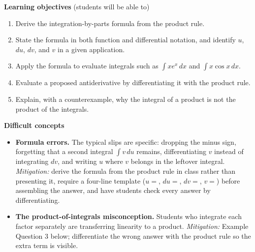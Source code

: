 \documentclass[11pt]{article}
\begin{document}
\textbf{Learning objectives} (students will be able to)
\begin{enumerate}
\item Derive the integration-by-parts formula from the product rule.
\item State the formula in both function and differential notation, and identify $u$, $du$, $dv$, and $v$ in a given application.
\item Apply the formula to evaluate integrals such as $\int xe^x\,dx$ and $\int x\cos x\,dx$.
\item Evaluate a proposed antiderivative by differentiating it with the product rule.
\item Explain, with a counterexample, why the integral of a product is not the product of the integrals.
\end{enumerate}

\textbf{Difficult concepts}
\begin{itemize}
\item \textbf{Formula errors.} The typical slips are specific: dropping the minus sign, forgetting that a second integral $\int v\,du$ remains, differentiating $v$ instead of integrating $dv$, and writing $u$ where $v$ belongs in the leftover integral. \emph{Mitigation:} derive the formula from the product rule in class rather than presenting it, require a four-line template ($u=$, $du=$, $dv=$, $v=$) before assembling the answer, and have students check every answer by differentiating.
\item \textbf{The product-of-integrals misconception.} Students who integrate each factor separately are transferring linearity to a product. \emph{Mitigation:} Example Question 3 below; differentiate the wrong answer with the product rule so the extra term is visible.
\end{itemize}
\end{document}
